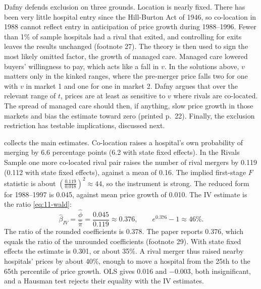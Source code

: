 Dafny defends exclusion on three grounds. Location is nearly fixed. There has been very little hospital entry since
the Hill-Burton Act of 1946, so co-location in 1988 cannot reflect entry in anticipation of price growth during
1988--1996. Fewer than 1\% of sample hospitals had a rival that exited, and controlling for exits leaves the results
unchanged (footnote 27). The theory is then used to sign the most likely omitted factor, the growth of managed
care. Managed care lowered buyers' willingness to pay, which acts like a fall in $v$. In the solutions above, $v$
matters only in the kinked ranges, where the pre-merger price falls two for one with $v$ in market 1 and one for one
in market 2. Dafny argues that over the relevant range of $t$, prices are at least as sensitive to $v$ where rivals
are co-located. The spread of managed care should then, if anything, slow price growth in those markets and bias
the estimate toward zero (printed p.~22). Finally, the exclusion restriction has testable implications, discussed
next.

  collects the main estimates. Co-location raises a hospital's own probability
of merging by 6.6 percentage points (6.2 with state fixed effects). In the Rivals Sample one more co-located rival
pair raises the number of rival mergers by 0.119 (0.112 with state fixed effects), against a mean of 0.16. The
implied first-stage $F$ statistic is about $(\frac{0.119}{0.018})^2\approx44$, so the instrument is strong. The
reduced form for 1988--1997 is 0.045, against mean price growth of 0.010. The IV estimate is the ratio
\eqref{eq:11-wald}:
\begin{equation*}
\hat\beta_{IV}=\frac{\hat\phi}{\hat\pi}=\frac{0.045}{0.119}\approx0.376,\qquad e^{0.376}-1\approx46\%.
\end{equation*}
The ratio of the rounded coefficients is 0.378. The paper reports 0.376, which equals the ratio of the unrounded
coefficients (footnote 29). With state fixed effects the estimate is 0.301, or about 35\%. A rival merger thus raised
nearby hospitals' prices by about 40\%, enough to move a hospital from the 25th to the 65th percentile of price
growth. OLS gives 0.016 and $-0.003$, both insignificant, and a Hausman test rejects their equality with the IV
estimates.

